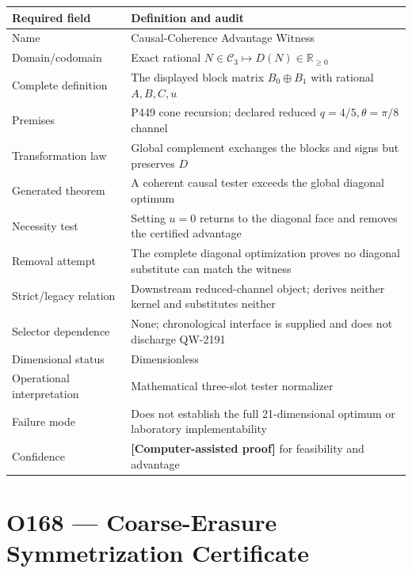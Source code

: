 \documentclass[11pt,a4paper,openany]{report}
\begin{document}
\begin{center}
\begingroup\small
\setlength{\tabcolsep}{2.5pt}
\renewcommand{\arraystretch}{1.16}
\begin{longtable}{@{}p{}p{}@{}}
\toprule
\textbf{Required field} & \textbf{Definition and audit} \\
\midrule
\endhead
Name & Causal-Coherence Advantage Witness \\
Domain/\allowbreak{}codomain & Exact rational \(N\in\mathcal C_3\mapsto D(N)\in\mathbb R_{\ge0}\) \\
Complete definition & The displayed block matrix \(B_0\oplus B_1\) with rational \(A,B,C,u\) \\
Premises & P449 cone recursion; declared reduced \(q=4/5,\theta=\pi/8\) channel \\
Transformation law & Global complement exchanges the blocks and signs but preserves \(D\) \\
Generated theorem & A coherent causal tester exceeds the global diagonal optimum \\
Necessity test & Setting \(u=0\) returns to the diagonal face and removes the certified advantage \\
Removal attempt & The complete diagonal optimization proves no diagonal substitute can match the witness \\
Strict/\allowbreak{}legacy relation & Downstream reduced-channel object; derives neither kernel and substitutes neither \\
Selector dependence & None; chronological interface is supplied and does not discharge QW-2191 \\
Dimensional status & Dimensionless \\
Operational interpretation & Mathematical three-slot tester normalizer \\
Failure mode & Does not establish the full 21-dimensional optimum or laboratory implementability \\
Confidence & \textbf{\textcolor{fingreen}{[Computer-assisted proof]}} for feasibility and advantage \\
\bottomrule
\end{longtable}
\endgroup
\end{center}

\section{O168 --- Coarse-Erasure Symmetrization Certificate}
\end{document}
